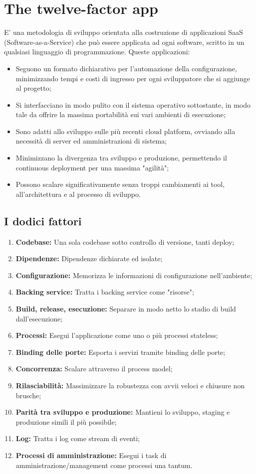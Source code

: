 \documentclass[PianoDiQualifica.tex]{subfiles}
\begin{document}
\chapter{The twelve-factor app}
E' una metodologia di sviluppo orientata alla costruzione di applicazioni SaaS (Software-as-a-Service) che può essere applicata ad ogni software, scritto in un qualsiasi linguaggio di programmazione.
Queste applicazioni:
\begin{itemize}
\item Seguono un formato dichiarativo per l'automazione della configurazione, minimizzando tempi e costi di ingresso per ogni sviluppatore che si aggiunge al progetto;
\item Si interfacciano in modo pulito con il sistema operativo sottostante, in modo tale da offrire la massima portabilità sui vari ambienti di esecuzione;
\item Sono adatti allo sviluppo sulle più recenti cloud platform, ovviando alla necessità di server ed amministrazioni di sistema;
\item Minimizzano la divergenza tra sviluppo e produzione, permettendo il continuous deployment per una massima "agilità";
\item Possono scalare significativamente senza troppi cambiamenti ai tool, all'architettura e al processo di sviluppo.
\end{itemize}

\section{I dodici fattori}
\begin{enumerate}
\item \textbf{Codebase:} Una sola codebase sotto controllo di versione, tanti deploy;
\item \textbf{Dipendenze:} Dipendenze dichiarate ed isolate;
\item \textbf{Configurazione:} Memorizza le informazioni di configurazione nell'ambiente;
\item \textbf{Backing service:} Tratta i backing service come "risorse";
\item \textbf{Build, release, esecuzione:} Separare in modo netto lo stadio di build dall'esecuzione;
\item \textbf{Processi:} Esegui l'applicazione come uno o più processi stateless;
\item \textbf{Binding delle porte:} Esporta i servizi tramite binding delle porte;
\item \textbf{Concorrenza:} Scalare attraverso il process model;
\item \textbf{Rilasciabilità:} Massimizzare la robustezza con avvii veloci e chiusure non brusche;
\item \textbf{Parità tra sviluppo e produzione:} Mantieni lo sviluppo, staging e produzione simili il più possibile;
\item \textbf{Log:} Tratta i log come stream di eventi;
\item \textbf{Processi di amministrazione:} Esegui i task di amministrazione/management come processi una tantum.
\end{enumerate}
\end{document}
